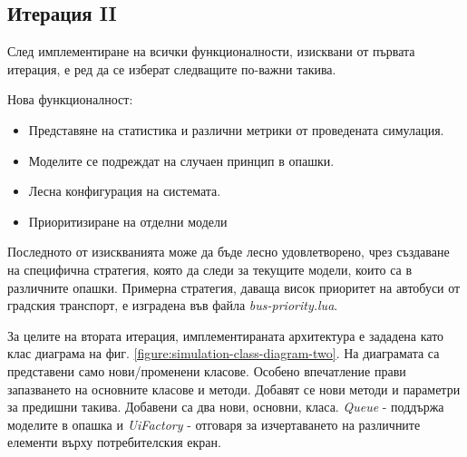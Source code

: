 	\subsection{Итерация II}
		
		След имплементиране на всички функционалности, изисквани от първата итерация, е ред да се изберат
		следващите по-важни такива.
		
		Нова функционалност:
		\begin{itemize}
			\item Представяне на статистика и различни метрики от проведената симулация.
			\item Моделите се подреждат на случаен принцип в опашки.
			\item Лесна конфигурация на системата.
			\item Приоритизиране на отделни модели
		\end{itemize}
		
		Последното от изискванията може да бъде лесно удовлетворено, чрез създаване на специфична стратегия,
		която да следи за текущите модели, които са в различните опашки. Примерна стратегия, даваща висок
		приоритет на автобуси от градския транспорт, е изградена във файла \emph{bus-priority.lua}.
		
		За целите на втората итерация, имплементираната архитектура е зададена като клас диаграма на фиг. \ref{figure:simulation-class-diagram-two}.
		На диаграмата са представени само нови/променени класове. Особено впечатление прави запазването на основните класове и методи. 
		Добавят се нови методи и параметри за предишни такива.	Добавени са два нови, основни, класа. \emph{Queue} - поддържа моделите
		в опашка и \emph{UiFactory} - отговаря за изчертаването на различните елементи върху потребителския екран.		
		
